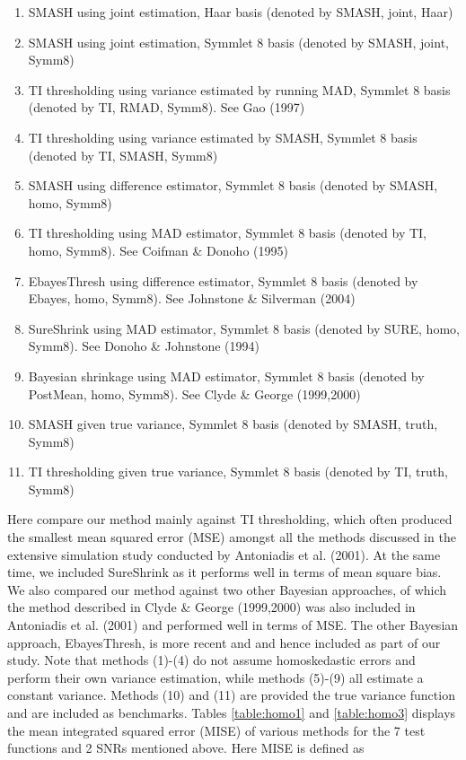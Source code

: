 \documentclass[12pt]{article}
\begin{document}
\begin{enumerate}
\item SMASH using joint estimation, Haar basis (denoted by SMASH, joint, Haar)
\item SMASH using joint estimation, Symmlet 8 basis (denoted by SMASH, joint, Symm8)
\item TI thresholding using variance estimated by running MAD, Symmlet 8 basis (denoted by TI, RMAD, Symm8). See Gao (1997)
\item TI thresholding using variance estimated by SMASH, Symmlet 8 basis (denoted by TI, SMASH, Symm8)
\item SMASH using difference estimator, Symmlet 8 basis (denoted by SMASH, homo, Symm8)
\item TI thresholding using MAD estimator, Symmlet 8 basis (denoted by TI, homo, Symm8). See Coifman \& Donoho (1995)
\item EbayesThresh using difference estimator, Symmlet 8 basis (denoted by Ebayes, homo, Symm8). See Johnstone \& Silverman (2004)
\item SureShrink using MAD estimator, Symmlet 8 basis (denoted by SURE, homo, Symm8). See Donoho \& Johnstone (1994)
\item Bayesian shrinkage using MAD estimator, Symmlet 8 basis (denoted by PostMean, homo, Symm8). See Clyde \& George (1999,2000)
\item SMASH given true variance, Symmlet 8 basis (denoted by SMASH, truth, Symm8)
\item TI thresholding given true variance, Symmlet 8 basis (denoted by TI, truth, Symm8)
\end{enumerate}
Here compare our method mainly against TI thresholding, which often produced the smallest mean squared error (MSE) amongst all the methods discussed in the extensive simulation study conducted by Antoniadis et al. (2001). At the same time, we included SureShrink as it performs well in terms of mean square bias. We also compared our method against two other Bayesian approaches, of which the method described in Clyde \& George (1999,2000) was also included in Antoniadis et al. (2001) and performed well in terms of MSE. The other Bayesian approach, EbayesThresh, is more recent and and hence included as part of our study. Note that methods (1)-(4) do not assume homoskedastic errors and perform their own variance estimation, while methods (5)-(9) all estimate a constant variance. Methods (10) and (11) are provided the true variance function and are included as benchmarks. Tables \ref{table:homo1} and \ref{table:homo3} displays the mean integrated squared error (MISE) of various methods for the 7 test functions and 2 SNRs mentioned above. Here MISE is defined as
\end{document}
